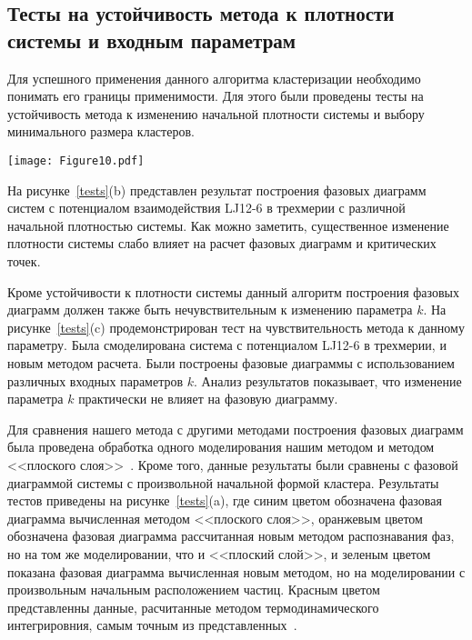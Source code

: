 \subsection{Тесты на устойчивость метода к плотности системы и входным параметрам}
\label{PRIMe-SubSecTests}


Для успешного применения данного алгоритма кластеризации необходимо понимать его границы применимости.
Для этого были проведены тесты на устойчивость метода к изменению начальной плотности системы и выбору минимального размера кластеров.

\begin{figure*}[!t]
    \centering
    \texttt{[image: Figure10.pdf]}
    \caption{\textbf{(a)} Сравнение различных методов построения фазовых диаграмм. Красным отмечен самый точный метод - термодинамическое интегрирование~\cite{10.1080/00268976.2019.1699185}.
             \textbf{(b)} Тест на влияние средней плотности на фазовую диаграмму системы LJ12-6 в трехмерии.
             \textbf{(c)} Тест на влияние начального параметра $k$ на фазовую диаграмму системы LJ12-6 в трехмерии.}
    \label{tests}
\end{figure*}



На рисунке~\ref{tests}(b) представлен результат построения фазовых диаграмм систем с потенциалом взаимодействия LJ12-6 в трехмерии с различной начальной плотностью системы. Как можно заметить, существенное изменение плотности системы слабо влияет на расчет фазовых диаграмм и критических точек.



Кроме устойчивости к плотности системы данный алгоритм построения фазовых диаграмм должен также быть нечувствительным к изменению параметра $k$.
На рисунке~\ref{tests}(c) продемонстрирован тест на чувствительность метода к данному параметру.
Была смоделирована система с потенциалом LJ12-6 в трехмерии, и новым методом расчета.
Были построены фазовые диаграммы с использованием различных входных параметров $k$.
Анализ результатов показывает, что изменение параметра $k$ практически не влияет на фазовую диаграмму.



Для сравнения нашего метода с другими методами построения фазовых диаграмм была проведена обработка одного моделирования нашим методом и методом <<плоского слоя>>~\cite{10.1021/jp806127j, 10.1021/jp1117213}.
Кроме того, данные результаты были сравнены с фазовой диаграммой системы с произвольной начальной формой кластера.
Результаты тестов приведены на рисунке~\ref{tests}(a), где синим цветом обозначена фазовая диаграмма вычисленная методом <<плоского слоя>>, оранжевым цветом обозначена фазовая диаграмма рассчитанная новым методом распознавания фаз, но на том же моделировании, что и <<плоский слой>>, и зеленым цветом показана фазовая диаграмма вычисленная новым методом, но на моделировании с произвольным начальным расположением частиц. Красным цветом представленны данные, расчитанные методом термодинамического интегрировния, самым точным из представленных~\cite{10.1080/00268976.2019.1699185}.

